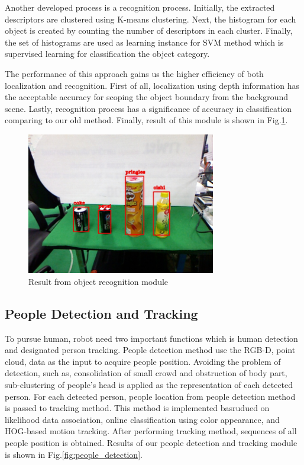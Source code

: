 \documentclass{llncs}
\begin{document}
Another developed process is a recognition process. Initially, the extracted descriptors are clustered using K-means clustering. Next, the histogram for each object is created by counting the number of descriptors in each cluster. Finally, the set of histograms are used as learning instance for SVM method which is supervised learning for classification the object category\cite{obj_rec}.

The performance of this approach gains us the higher efficiency of both localization and recognition. First of all, localization using depth information has the acceptable accuracy for scoping the object boundary from the background scene. Lastly, recognition process has a significance of accuracy in classification comparing to our old method. Finally, result of this module is shown in Fig.\ref{fig:object_recog}.

\begin{figure}
\centering
\includegraphics[height=6.2cm]{object_recognition_figure}
\caption{Result from object recognition module}
\label{fig:object_recog}
\end{figure}

\subsection{People Detection and Tracking}

To pursue human, robot need two important functions which is human detection and designated person tracking. People detection method use the RGB-D, point cloud, data as the input to acquire people position. Avoiding the problem of detection, such as, consolidation of small crowd and obstruction of body part, sub-clustering of people's head is applied as the representation of each detected person. For each detected person, people location from people detection method is passed to tracking method. This method is implemented basrudued on likelihood data association, online classification using color appearance, and HOG-based motion tracking\cite{pp_detect}. After performing tracking method, sequences of all people position is obtained. Results of our people detection and tracking module is shown in Fig.\ref{fig:people_detection}.
\end{document}
